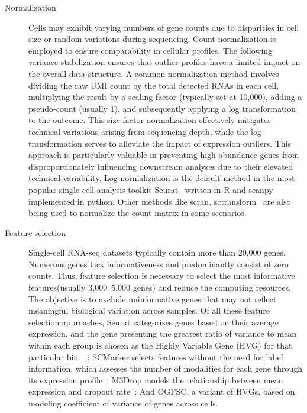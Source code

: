 \begin{description}
	\item[Normalization]
	Cells may exhibit varying numbers of gene counts due to disparities in cell size or random variations during sequencing. Count normalization is employed to ensure comparability in cellular profiles. The following variance stabilization ensures that outlier profiles have a limited impact on the overall data structure. A common normalization method involves dividing the raw UMI count by the total detected RNAs in each cell, multiplying the result by a scaling factor (typically set at 10,000), adding a pseudo-count (usually 1), and subsequently applying a log transformation to the outcome. This size-factor normalization effectively mitigates technical variations arising from sequencing depth, while the log transformation serves to alleviate the impact of expression outliers. This approach is particularly valuable in preventing high-abundance genes from disproportionately influencing downstream analyses due to their elevated technical variability. Log-normalization is the default method in the most popular single cell analysis toolkit Seurat~\citep{stuart2019seurat3} written in R and scanpy\citep{wolf2018scanpy} implemented in python. Other methods like scran, sctransform~\citep{l2016scran,hafemeister2019sctransform} are also being used to normalize the count matrix in some scenarios.

	\item[Feature selection]
	 Single-cell RNA-seq datasets typically contain more than 20,000 genes. Numerous genes lack informativeness and predominantly consist of zero counts. Thus, feature selection is necessary to select the most informative features(usually 3,000~5,000 genes) and reduce the computing resources. The objective is to exclude uninformative genes that may not reflect meaningful biological variation across samples. Of all these feature selection approaches, Seurat categorizes genes based on their average expression, and the gene presenting the greatest ratio of variance to mean within each group is chosen as the Highly Variable Gene (HVG) for that particular bin. ~\citep{stuart2019seurat3}; SCMarker selects features without the need for label information, which assesses the number of modalities for each gene through its expression profile~\citep{wang2019scmarker}; M3Drop models the relationship between mean expression and dropout rate~\citep{andrews2019m3drop}; And OGFSC, a variant of HVGs, based on modeling coefficient of variance of genes across cells. ~\citep{hao2019OGFSC}
\end{description}


